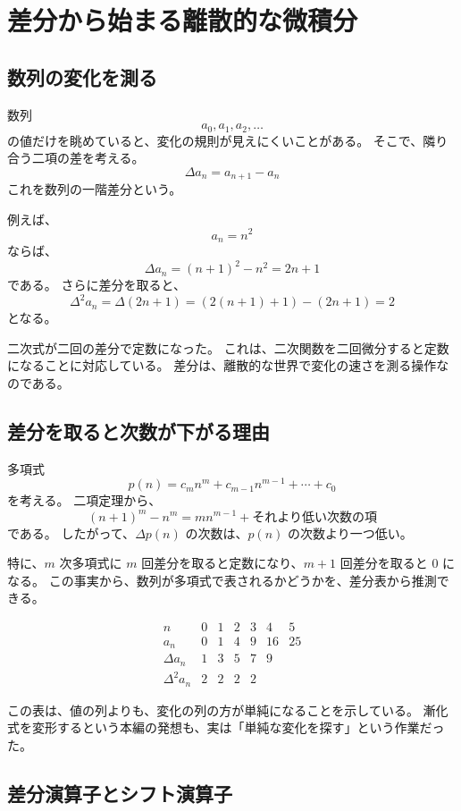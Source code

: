 
\section{差分から始まる離散的な微積分}

\subsection{数列の変化を測る}

数列
\[
  a_0,a_1,a_2,\ldots
\]
の値だけを眺めていると、変化の規則が見えにくいことがある。
そこで、隣り合う二項の差を考える。
\[
  \Delta a_n=a_{n+1}-a_n
\]
これを数列の一階差分という。

例えば、
\[
  a_n=n^2
\]
ならば、
\[
  \Delta a_n=(n+1)^2-n^2=2n+1
\]
である。
さらに差分を取ると、
\[
  \Delta^2a_n
  =\Delta(2n+1)
  =(2(n+1)+1)-(2n+1)=2
\]
となる。

二次式が二回の差分で定数になった。
これは、二次関数を二回微分すると定数になることに対応している。
差分は、離散的な世界で変化の速さを測る操作なのである。

\subsection{差分を取ると次数が下がる理由}

多項式
\[
  p(n)=c_mn^m+c_{m-1}n^{m-1}+\cdots+c_0
\]
を考える。
二項定理から、
\[
  (n+1)^m-n^m
  =mn^{m-1}+\text{それより低い次数の項}
\]
である。
したがって、$\Delta p(n)$ の次数は、$p(n)$ の次数より一つ低い。

特に、$m$ 次多項式に $m$ 回差分を取ると定数になり、$m+1$ 回差分を取ると $0$ になる。
この事実から、数列が多項式で表されるかどうかを、差分表から推測できる。

\[
  \begin{array}{c|cccccc}
    n           & 0 & 1 & 2 & 3 & 4  & 5  \\ \hline
    a_n         & 0 & 1 & 4 & 9 & 16 & 25 \\
    \Delta a_n  & 1 & 3 & 5 & 7 & 9  &    \\
    \Delta^2a_n & 2 & 2 & 2 & 2 &    &
  \end{array}
\]

この表は、値の列よりも、変化の列の方が単純になることを示している。
漸化式を変形するという本編の発想も、実は「単純な変化を探す」という作業だった。

\subsection{差分演算子とシフト演算子}

